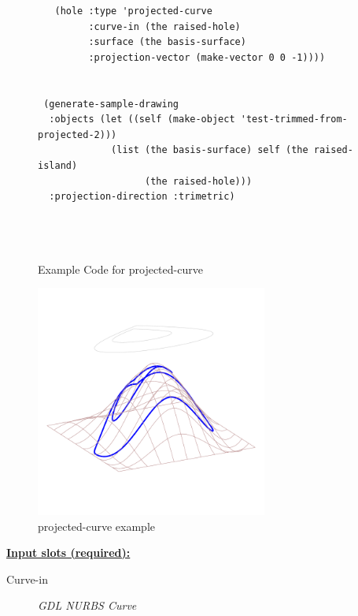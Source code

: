 \documentclass [11pt]{book}
\begin{document}
\begin{itemize}
\begin{figure}
\begin{lrbox}{\boxedverb}
\begin{minipage}{\linewidth}
{\begin{verbatim}
   (hole :type 'projected-curve
         :curve-in (the raised-hole)
         :surface (the basis-surface)
         :projection-vector (make-vector 0 0 -1))))


 (generate-sample-drawing 
  :objects (let ((self (make-object 'test-trimmed-from-projected-2)))
             (list (the basis-surface) self (the raised-island) 
                   (the raised-hole)))
  :projection-direction :trimetric)
 

 
\end{verbatim}}
\end{minipage}
\end{lrbox}
\fbox{\usebox{\boxedverb}}

\caption{Example Code for projected-curve}

\label{fig:example-code-projected-curve}

\end{figure}

\begin{figure}
\begin{center}
\includegraphics[width=3in,height=3in]{../images/example-projected-curve.pdf}
\end{center}

\caption{projected-curve example}

\label{fig:projected-curve}

\end{figure}





\textbf{
\underline{Input slots (required):}}

\begin{description}

\item [Curve-in]
\emph{GDL NURBS Curve}


\end{description}
\end{itemize}
\end{document}
